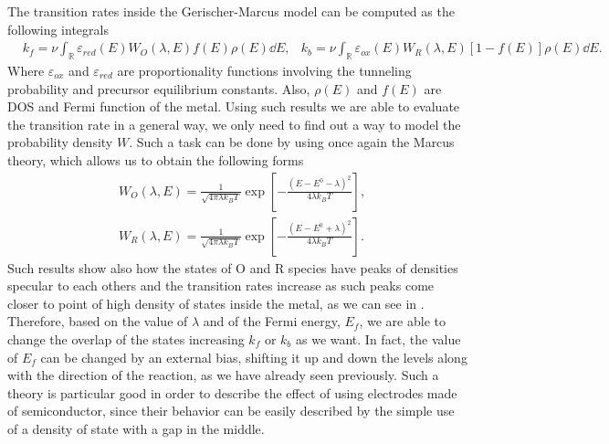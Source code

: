 {
    The transition rates inside the Gerischer-Marcus model can be computed as the following integrals
    \begin{align}
        &k_f = \nu\int_\mathbb{R} \varepsilon_{red}(E)W_O(\lambda, E) f(E)\rho(E)\dd E, &k_b = \nu\int_\mathbb{R} \varepsilon_{ox}(E)W_R(\lambda, E) [1-f(E)]\rho(E)\dd E.
    \end{align}
    Where $\varepsilon_{ox}$ and $\varepsilon_{red}$ are proportionality functions involving the tunneling probability and precursor equilibrium constants. Also, $\rho(E)$ and $f(E)$ are DOS and Fermi function of the metal.
}
\noindent
Using such results we are able to evaluate the transition rate in a general way, we only need to find out a way to model the probability density $W$. Such a task can be done by using once again the Marcus theory, which allows us to obtain the following forms
\begin{align}
    &W_O(\lambda, E) = \frac{1}{\sqrt{4\pi\lambda k_BT}}\exp\left[ -\frac{\left( E - E^0 - \lambda \right)^2}{4\lambda k_BT} \right], \\
    &W_R(\lambda, E) = \frac{1}{\sqrt{4\pi\lambda k_BT}}\exp\left[ -\frac{\left( E - E^0 + \lambda \right)^2}{4\lambda k_BT} \right].
\end{align}
Such results show also how the states of O and R species have peaks of densities specular to each others and the transition rates increase as such peaks come closer to point of high density of states inside the metal, as we can see in . Therefore, based on the value of $\lambda$ and of the Fermi energy, $E_f$, we are able to change the overlap of the states increasing $k_f$ or $k_b$ as we want. In fact, the value of $E_f$ can be changed by an external bias, shifting it up and down the levels along with the direction of the reaction, as we have already seen previously.
\nt
{
    Such a theory is particular good in order to describe the effect of using electrodes made of semiconductor, since their behavior can be easily described by the simple use of a density of state with a gap in the middle.
}